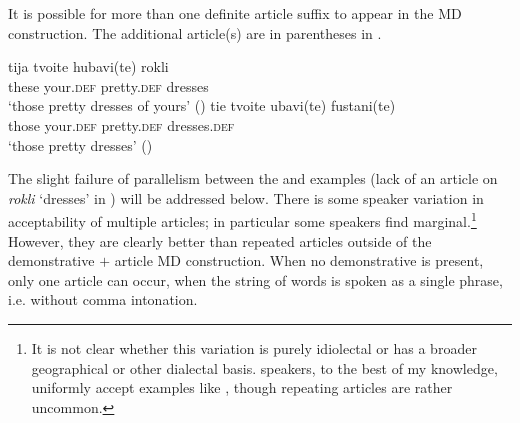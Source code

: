 \documentclass[output=paper,
colorlinks,
citecolor=brown,
newtxmath
]{langscibook}
\begin{document}
\noindent It is possible for more than one definite article suffix to appear in the MD construction. The additional article(s) are in parentheses in .


    \largerpage

\ea \label{dresses2}
\ea \label{dresses2b}
\gll tija 	tvoite	hubavi(te) 	rokli\\
these 	your.\textsc{def}	pretty.\textsc{def}	dresses \\
\glt ‘those pretty dresses of yours’ \hfill()
\ex \label{dresses2m}
\gll tie 	tvoite ubavi(te)	fustani(te) \\
those your.\textsc{def}	pretty.\textsc{def} 	dresses.\textsc{def} \\
\glt‘those pretty dresses’ \hfill()
\z
\z

\noindent The slight failure of parallelism between the  and  examples (lack of an article on \textit{rokli} `dresses' in ) will be addressed below. There is some speaker variation in acceptability of multiple articles; in particular some  speakers find  marginal.\footnote{It is not clear whether this variation is purely idiolectal or has a broader geographical or other dialectal basis.  speakers, to the best of my knowledge, uniformly accept examples like , though repeating articles are rather uncommon.} However, they are clearly better than repeated articles outside of the demonstrative $+$ article MD construction. When no demonstrative is present, only one article can occur, when the string of words is spoken as a single phrase, i.e. without comma intonation.

\end{document}
